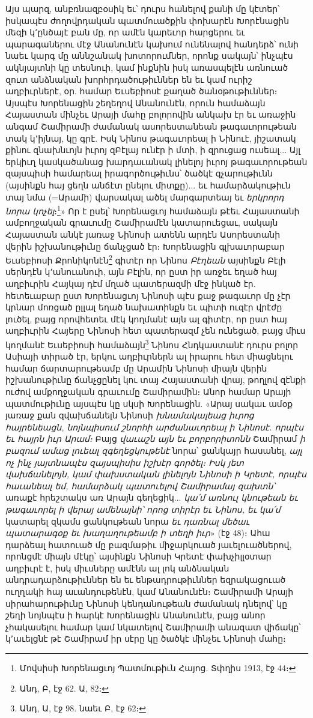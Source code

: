 \documentclass{article}
\begin{document}
{Այս պարզ, անբռնազբօսիկ եւ՝ դուրս հանելով քանի մը կէտեր՝ իսկապէս ժողովրդական պատմուածքին փոխարէն Խորէնացին մեզի կ՚ընծայէ բան մը, որ ամէն կարեւոր հարցերու եւ պարագաներու մէջ Անանունէն կախում ունենալով հանդերձ՝ ունի նաեւ կարգ մը աննշանակ խոտորումներ, որոնք սակայն՝ ինչպէս ակնյայտնի կը տեսնուի, կամ ինքնին իսկ առասպելէն առնուած զուտ անձնական խորհրդածութիւններ են եւ կամ ուրիշ աղբիւրներէ, օր. համար Եւսեբիոսէ քաղած ծանօթութիւններ։ Այսպէս Խորենացին շեղեղով Անանունէն, որուն համաձայն Հայաստան մինչեւ Արայի մահը բոլորովին անկախ էր եւ առաջին անգամ Շամիրամի ժամանակ ասորեստանեան թագաւորութեան տակ կ՚իյնայ, կը գրէ. Իսկ Նինոս թագաւորեալ ի Նինուէ, յիշատակ քինու զնախնւոյն իւրոյ զԲէլայ ունէր ի մտի, ի զրուցաց ուսեալ... Այլ երկիւղ կասկածանաց խարդաւանակ լինելոյ իւրոյ թագաւորութեան զայսպիսի համարեալ իրագործութիւնս՝ ծածկէ զչարութիւնն (այսինքն հայ ցեղն անճէտ ընելու միտքը)... եւ համարձակութիւն տայ նմա (=Արամի) վարսակալ ածել մարգարտեայ եւ \emph{երկրորդ նորա կոչել}։\footnote{Մովսիսի Խորենացւոյ Պատմութիւն Հայոց. Տփղիս 1913, էջ 44։}» Որ է ըսել՝ Խորենացւոյ համաձայն թէեւ Հայաստանի ամբողջական գրաւումը Շամիրամէն կատարուեցաւ, սակայն Հայաստան անկէ յառաջ Նինոսի ատենն արդէն Ասորեստանի վերին իշխանութիւնը ճանչցած էր։ Խորենացին գլխաւորաբար Եւսեբիոսի Քրոնիկոնէն\footnote{Անդ, Բ, էջ 62. Ա, 82։} գիտէր որ Նինոս \emph{Բէղեան} այսինքն Բէլի սերնդէն կ՚անուանուի, այն Բէլին, որ ըստ իր առջեւ եղած հայ աղբիւրին Հայկայ դէմ մղած պատերազմի մէջ ինկած էր. հետեւաբար ըստ Խորենացւոյ Նինոսի պէս քաջ թագաւոր մը չէր կրնար մոռցած ըլլալ եղած նախատինքն եւ պիտի ուզէր վրէժը լուծել, բայց որովհետեւ մէկ կողմանէ այն ալ գիտէր, որ ըստ հայ աղբիւրին Հայերը Նինոսի հետ պատերազմ չեն ունեցած, բայց միւս կողմանէ Եւսեբիոսի համաձայն\footnote{Անդ, Ա, էջ 98. նաեւ Բ, էջ 62։} Նինոս Հնդկաստանէ դուրս բոլոր Ասիայի տիրած էր, երկու աղբիւրներն ալ իրարու հետ միացնելու համար ճարտարութեամբ մը Արամին Նինոսի միայն վերին իշխանութիւնը ճանչցընել կու տայ Հայաստանի վրայ, թողլով զէնքի ուժով ամքողջական գրաւումը Շամիրամին։ Անոր համար Արայի պատմութիւնը այսպէս կը սկսի Խորենացին. «Արայ սակաւ ամօք յառաջ քան զվախճանելն Նինոսի \emph{խնամակալեաց իւրոց հայրենեացն, նոյնպիսում շնորհի արժանաւորեալ ի Նինոսէ. որպէս եւ հայրն իւր Արամ։} Բայց \emph{վաւաշն այն եւ բորբորիտոնն} Շամիրամ \emph{ի բազում ամաց լուեալ զգեղեցկութենէ} նորա՝ ցանկայր հասանել, \emph{այլ ոչ ինչ յայտնապէս զայսպիսիս իշխէր գործել։ Իսկ յետ վախճանելոյն, կամ փախստական լինելոյն Նինոսի ի Կրետէ, որպէս հաւանեալ եմ, համարձակ պատուելով Շամիրամայ զախտն՝} առաքէ հրեշտակս առ Արայն գեղեցիկ... \emph{կա՛մ առնուլ կնութեան եւ թագաւորել ի վերայ ամենայնի՝ որոց տիրէր եւ Նինոս, եւ կա՛մ} կատարել զկամս ցանկութեան նորա \emph{եւ դառնալ մեծաւ պատարագօք եւ խաղաղութեամբ ի տեղի իւր}» (էջ 48)։ Ահա դարձեալ հատուած մը բազմաթիւ միջարկուած յաւելուածներով, որոնցմէ միայն մէկը՝ այսինքն Նինոսի Կրետէ փախչիլլօտար աղբիւրէ է, իսկ միւսները ամէնն ալ լոկ անձնական անդրադարձութիւններ են եւ ենթադրութիւններ եզրակացուած ուղղակի հայ աւանդութենէն, կամ Անանունէն։ Շամիրամի Արայի սիրահարութիւնը Նինոսի կենդանութեան ժամանակ դնելով՝ կը շեղի նոյնպէս ի հարկէ Խորենացին Անանունէն, բայց անոր չհակասելու համար կամ նկատելով Շամիրամի անազատ վիճակը՝ կ՚աւելցնէ թէ Շամիրամ իր սէրը կը ծածկէ մինչեւ Նինոսի մահը։

}
\end{document}
